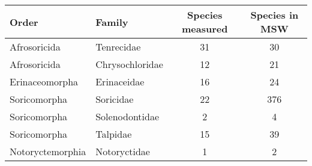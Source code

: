 

\begin{tabular}{llcc}

\hline
\textbf{Order} & \textbf{Family} & \textbf{Species measured} & \textbf{Species in MSW} \\
\hline
Afrosoricida & Tenrecidae & 31 & 30 \\
Afrosoricida & Chrysochloridae & 12 & 21\\
Erinaceomorpha & Erinaceidae & 16 & 24 \\
Soricomorpha & Soricidae & 22 & 376 \\
Soricomorpha & Solenodontidae & 2 & 4 \\
Soricomorpha & Talpidae & 15 & 39 \\
Notoryctemorphia & Notoryctidae & 1 & 2 \\
\hline
\end{tabular}

